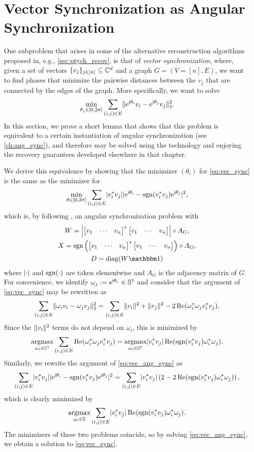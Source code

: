 \section{Vector Synchronization as Angular Synchronization}
One subproblem that arises in some of the alternative reconstruction algorithms proposed in, e.g., \cref{sec:ptych_recov}, is that of \emph{vector synchronization}, where, given a set of vectors $\{v_j\}_{j \in [n]} \subseteq \mathbb{C}^d$ and a graph $G = (V = [n], E)$, we want to find phases that minimize the pairwise distances between the $v_j$ that are connected by the edges of the graph.  More specifically, we want to solve \begin{equation} \min_{\theta_{j} \in [0, 2\pi]} \sum_{(i, j) \in E} \lVert\mathrm{e}^{\mathrm{i} \theta_{i}} v_i - \mathrm{e}^{\mathrm{i} \theta_{j}} v_j\rVert_2^2. \label{eq:vec_sync} \end{equation}  In this section, we prove a short lemma that shows that this problem is equivalent to a certain instantiation of angular synchronization (see \cref{ch:ang_sync}), and therefore may be solved using the technology and enjoying the recovery guarantees developed elsewhere in that chapter.

We derive this equivalence by showing that the minimizer $(\theta_i)$ for \eqref{eq:vec_sync} is the same as the minimizer for \begin{equation} \min_{\theta \in [0, 2\pi]} \sum_{(i, j) \in E} \lvert v_i^* v_j\rvert \lvert\mathrm{e}^{\mathrm{i} \theta_{i}} - \operatorname{sgn}(v_i^* v_j) \mathrm{e}^{\mathrm{i} \theta_{j}}\rvert^2, \label{eq:vec_ang_sync} \end{equation} which is, by following , an angular synchronization problem with \begin{equation} \begin{gathered} W = \abs*{\rowmat{v}{1}{n}^* \rowmat{v}{1}{n}} \circ A_G, \\ X = \sgn\left(\rowmat{v}{1}{n}^* \rowmat{v}{1}{n}\right) \circ A_G, \\ D = \diag(W \one)\end{gathered} \label{eq:vec_sync_mats}\end{equation} where $\lvert\cdot\rvert$ and $\operatorname{sgn}(\cdot)$ are taken elementwise and $A_G$ is the adjacency matrix of $G$.  For convenience, we identify $\omega_j := \mathrm{e}^{\mathrm{i} \theta_{j}} \in \mathbb{S}^1$ and consider that the argument of \eqref{eq:vec_sync} may be rewritten as \[\sum_{(i, j) \in E} \lVert\omega_i v_i - \omega_j v_j\rVert_2^2 = \sum_{(i, j) \in E} \lVert v_i\rVert^2 + \lVert v_j\rVert^2 - 2 \operatorname{Re}(\omega_i^* \omega_j v_i^* v_j).\]  Since the $\lVert v_i\rVert^2$ terms do not depend on $\omega_i$, this is minimized by \[\operatorname*{argmax}_{\omega_i \in \mathbb{S}^1} \sum_{(i, j) \in E} \operatorname{Re}(\omega_i^* \omega_j v_i^* v_j) = \operatorname*{argmax}_{\omega_i \in \mathbb{S}^1} \lvert v_i^* v_j\rvert \operatorname{Re}(\operatorname{sgn}(v_i^* v_j) \omega_i^* \omega_j).\]  Similarly, we rewrite the argument of \eqref{eq:vec_ang_sync} as \begin{equation} \sum_{(i, j) \in E} \lvert v_i^* v_j\rvert \lvert\mathrm{e}^{\mathrm{i} \theta_{i}} - \operatorname{sgn}(v_i^* v_j) \mathrm{e}^{\mathrm{i} \theta_{j}}\rvert^2 = \sum_{(i, j) \in E} \lvert v_i^* v_j\rvert \left(2 - 2 \operatorname{Re}(\operatorname{sgn}(v_i^* v_j) \omega_i^* \omega_j)\right),\label{eq:vec_as_re}\end{equation} which is clearly minimized by \[\operatorname*{argmax}_{\omega_i \in \mathbb{S}} \sum_{(i, j) \in E} \lvert v_i^* v_j\rvert \operatorname{Re}(\operatorname{sgn}(v_i^* v_j) \omega_i^* \omega_j).\]  The minimizers of these two problems coincide, so by solving \eqref{eq:vec_ang_sync}, we obtain a solution to \eqref{eq:vec_sync}.

